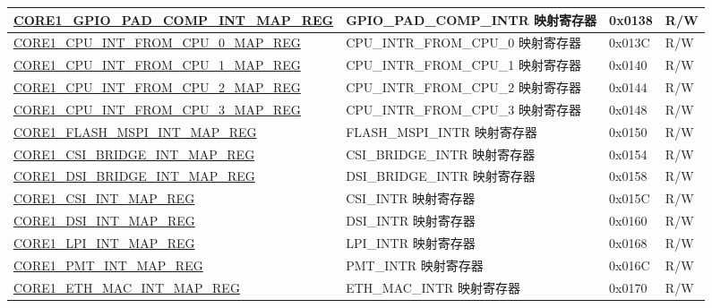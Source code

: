 \begin{longtable}{ | p{8.7cm} | p{6.2cm} | p{1.3cm} | p{1cm} | }
\hyperref[regdesc:CORE1GPIOPADCOMPINTMAPREG]{CORE1\_GPIO\_PAD\_COMP\_INT\_MAP\_REG} & GPIO\_PAD\_COMP\_INTR 映射寄存器 & 0x0138 & R/W \\ \hline

\hyperref[regdesc:CORE1CPUINTFROMCPU0MAPREG]{CORE1\_CPU\_INT\_FROM\_CPU\_0\_MAP\_REG} & CPU\_INTR\_FROM\_CPU\_0 映射寄存器 & 0x013C & R/W \\ \hline

\hyperref[regdesc:CORE1CPUINTFROMCPU1MAPREG]{CORE1\_CPU\_INT\_FROM\_CPU\_1\_MAP\_REG} & CPU\_INTR\_FROM\_CPU\_1 映射寄存器 & 0x0140 & R/W \\ \hline

\hyperref[regdesc:CORE1CPUINTFROMCPU2MAPREG]{CORE1\_CPU\_INT\_FROM\_CPU\_2\_MAP\_REG} & CPU\_INTR\_FROM\_CPU\_2 映射寄存器 & 0x0144 & R/W \\ \hline

\hyperref[regdesc:CORE1CPUINTFROMCPU3MAPREG]{CORE1\_CPU\_INT\_FROM\_CPU\_3\_MAP\_REG} & CPU\_INTR\_FROM\_CPU\_3 映射寄存器 & 0x0148 & R/W \\ \hline


\hyperref[regdesc:CORE1FLASHMSPIINTMAPREG]{CORE1\_FLASH\_MSPI\_INT\_MAP\_REG} & FLASH\_MSPI\_INTR 映射寄存器 & 0x0150 & R/W \\ \hline

\hyperref[regdesc:CORE1CSIBRIDGEINTMAPREG]{CORE1\_CSI\_BRIDGE\_INT\_MAP\_REG} & CSI\_BRIDGE\_INTR 映射寄存器 & 0x0154 & R/W \\ \hline

\hyperref[regdesc:CORE1DSIBRIDGEINTMAPREG]{CORE1\_DSI\_BRIDGE\_INT\_MAP\_REG} & DSI\_BRIDGE\_INTR 映射寄存器 & 0x0158 & R/W \\ \hline

\hyperref[regdesc:CORE1CSIINTMAPREG]{CORE1\_CSI\_INT\_MAP\_REG} & CSI\_INTR 映射寄存器 & 0x015C & R/W \\ \hline

\hyperref[regdesc:CORE1DSIINTMAPREG]{CORE1\_DSI\_INT\_MAP\_REG} & DSI\_INTR 映射寄存器 & 0x0160 & R/W \\ \hline


\hyperref[regdesc:CORE1LPIINTMAPREG]{CORE1\_LPI\_INT\_MAP\_REG} & LPI\_INTR 映射寄存器 & 0x0168 & R/W \\ \hline

\hyperref[regdesc:CORE1PMTINTMAPREG]{CORE1\_PMT\_INT\_MAP\_REG} & PMT\_INTR 映射寄存器 & 0x016C & R/W \\ \hline

\hyperref[regdesc:CORE1SBDINTMAPREG]{CORE1\_ETH\_MAC\_INT\_MAP\_REG} & ETH\_MAC\_INTR 映射寄存器 & 0x0170 & R/W \\ \hline


\end{longtable}
